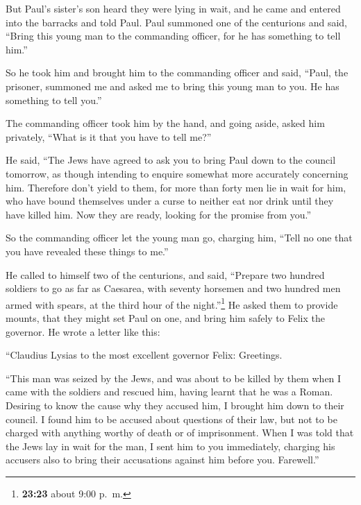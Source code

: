  But Paul's sister's son heard they were lying in wait,
and he came and entered into the barracks and told Paul. 
Paul summoned one of the centurions and said, ``Bring this young man to
the commanding officer, for he has something to tell him.''

 So he took him and brought him to the commanding officer
and said, ``Paul, the prisoner, summoned me and asked me to bring this
young man to you. He has something to tell you.''

 The commanding officer took him by the hand, and going
aside, asked him privately, ``What is it that you have to tell me?''

 He said, ``The Jews have agreed to ask you to bring Paul
down to the council tomorrow, as though intending to enquire somewhat
more accurately concerning him.  Therefore don't yield to
them, for more than forty men lie in wait for him, who have bound
themselves under a curse to neither eat nor drink until they have killed
him. Now they are ready, looking for the promise from you.''

 So the commanding officer let the young man go, charging
him, ``Tell no one that you have revealed these things to me.''

 He called to himself two of the centurions, and said,
``Prepare two hundred soldiers to go as far as Caesarea, with seventy
horsemen and two hundred men armed with spears, at the third hour of the
night.''\footnote{\textbf{23:23} about 9:00 p.~m.}  He
asked them to provide mounts, that they might set Paul on one, and bring
him safely to Felix the governor.  He wrote a letter like
this:

 ``Claudius Lysias to the most excellent governor Felix:
Greetings.

 ``This man was seized by the Jews, and was about to be
killed by them when I came with the soldiers and rescued him, having
learnt that he was a Roman.  Desiring to know the cause
why they accused him, I brought him down to their council.
 I found him to be accused about questions of their law,
but not to be charged with anything worthy of death or of imprisonment.
 When I was told that the Jews lay in wait for the man, I
sent him to you immediately, charging his accusers also to bring their
accusations against him before you. Farewell.''

